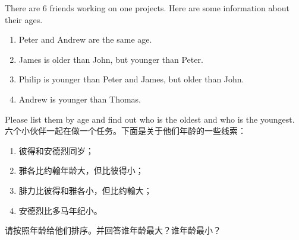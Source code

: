 \begin{example}
\begin{paracol}{2}
There are 6 friends working on one projects. Here are some information about their ages.
\begin{enumerate}
\item Peter and Andrew are the same age.
\item James is older than John, but younger than Peter.
\item Philip is younger than Peter and James, but older than John.
\item Andrew is younger than Thomas.
\end{enumerate}
Please list them by age and find out who is the oldest and who is the youngest.
\switchcolumn[1]
六个小伙伴一起在做一个任务。下面是关于他们年龄的一些线索：
\begin{enumerate}
\item 彼得和安德烈同岁；
\item 雅各比约翰年龄大，但比彼得小；
\item 腓力比彼得和雅各小，但比约翰大；
\item 安德烈比多马年纪小。
\end{enumerate}
请按照年龄给他们排序。并回答谁年龄最大？谁年龄最小？
\end{paracol}
\end{example}
